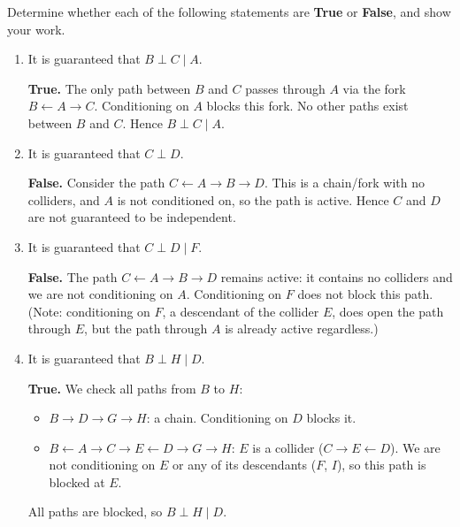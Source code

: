 \noindent
Determine whether each of the following statements are \textbf{True} or \textbf{False}, and show your work.
  \begin{enumerate}
    \item \points[2] It is guaranteed that $B \perp C \mid A$.

    \begin{solution}
    \textbf{True.} The only path between $B$ and $C$ passes through $A$ via the fork $B \leftarrow A \rightarrow C$. Conditioning on $A$ blocks this fork. No other paths exist between $B$ and $C$. Hence $B \perp C \mid A$.
    \end{solution}
    \vspace{30pt}

    \item \points[2] It is guaranteed that $C \perp D$.

    \begin{solution}
    \textbf{False.} Consider the path $C \leftarrow A \rightarrow B \rightarrow D$. This is a chain/fork with no colliders, and $A$ is not conditioned on, so the path is active. Hence $C$ and $D$ are not guaranteed to be independent.
    \end{solution}
    \vspace{30pt}

    \item \points[2] It is guaranteed that $C \perp D \mid F$.

    \begin{solution}
    \textbf{False.} The path $C \leftarrow A \rightarrow B \rightarrow D$ remains active: it contains no colliders and we are not conditioning on $A$. Conditioning on $F$ does not block this path. (Note: conditioning on $F$, a descendant of the collider $E$, does open the path through $E$, but the path through $A$ is already active regardless.)
    \end{solution}
    \vspace{30pt}

    \item \points[2] It is guaranteed that $B \perp H \mid D$.

    \begin{solution}
    \textbf{True.} We check all paths from $B$ to $H$:
    \begin{itemize}
      \item $B \rightarrow D \rightarrow G \rightarrow H$: a chain. Conditioning on $D$ blocks it. \checkmark
      \item $B \leftarrow A \rightarrow C \rightarrow E \leftarrow D \rightarrow G \rightarrow H$: $E$ is a collider ($C \rightarrow E \leftarrow D$). We are not conditioning on $E$ or any of its descendants ($F$, $I$), so this path is blocked at $E$. \checkmark
    \end{itemize}
    All paths are blocked, so $B \perp H \mid D$.
    \end{solution}
    \vspace{30pt}
  \end{enumerate}

